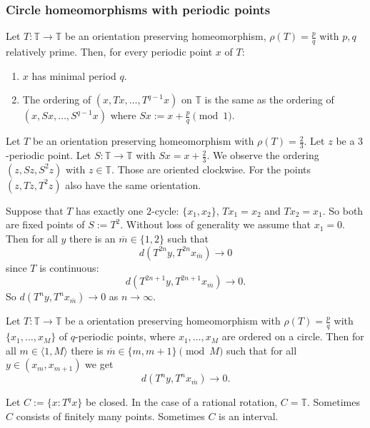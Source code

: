 \documentclass{article}
\newcommand*{\T}{\mathbb{T}}
\newcommand*{\jbr}[1]{{\langle #1 \rangle}}
\begin{document}
\subsubsection{Circle homeomorphisms with periodic points}

\begin{prop}
    Let $T:\T\to\T$ be an orientation preserving homeomorphism, $\rho(T)=\frac pq$ with $p,q$ relatively prime. Then, for every periodic point $x$ of $T$:
    \begin{enumerate}
        \item $x$ has minimal period $q$.

        \item The ordering of $(x,Tx,\dots, T^{q-1}x)$ on $\T$ is the same as the ordering of $(x,Sx,\dots,S^{q-1}x)$ where $Sx:=x+\frac pq \pmod1$.
    \end{enumerate}
\end{prop}

\begin{exam}
    Let $T$ be an orientation preserving homeomorphism with $\rho(T)=\frac23$. Let $z$ be a $3$-periodic point. Let $S:\T\to\T$ with $Sx=x+\frac23$. We observe the ordering $(z, Sz, S^2z)$ with $z\in \T$. Those are oriented clockwise. For  the points $(z,Tz,T^2z)$ also have the same orientation.
\end{exam}

\begin{exam}
    Suppose that $T$ has exactly one $2$-cycle: $\{x_1,x_2\}$, $Tx_1=x_2$ and $Tx_2=x_1$. So both are fixed points of $S:=T^2$. Without loss of generality we assume that $x_1 = 0$. Then for all $y$ there is an $\overline m\in\{1,2\}$ such that
    $$d(T^{2n}y,T^{2n}x_{\overline m}) \to 0$$
    since $T$ is continuous:
    $$d(T^{2n+1}y,T^{2n+1}x_{\overline m}) \to 0.$$
    So $d(T^ny,T^nx_{\overline m}) \to 0$ as $n\to\infty$.
\end{exam}

\begin{thm}
    Let $T:\T\to\T$ be a orientation preserving homeomorphism with $\rho(T) = \frac pq$ with $\{x_1,\dots,x_M\}$ of $q$-periodic points, where $x_1,\dots,x_M$ are ordered on a circle. Then for all $m\in\jbr{1,M}$ there is $\overline m\in \{m,m+1\}\pmod M$ such that for all $y \in (x_m,x_{m+1})$ we get
    $$d(T^ny,T^nx_{\overline m}) \to 0.$$
\end{thm}

Let $C:=\{x:T^qx\}$ be closed. In the case of a rational rotation, $C = \T$. Sometimes $C$ consists of finitely many points. Sometimes $C$ is an interval.
\end{document}
